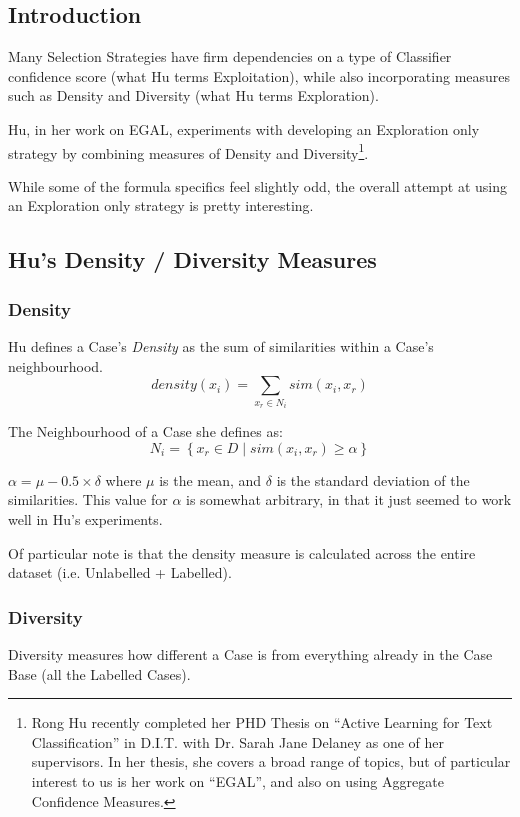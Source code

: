 \documentclass[a4paper,11pt]{report}
\begin{document}
\subsection{Introduction}
Many Selection Strategies have firm dependencies on a type of Classifier confidence score (what Hu terms Exploitation), while also incorporating measures such as Density and Diversity (what Hu terms Exploration).

Hu, in her work on EGAL, experiments with developing an Exploration only strategy by combining measures of Density and Diversity\footnote{Rong Hu recently completed her PHD Thesis on ``Active Learning for Text Classification'' in D.I.T. with Dr. Sarah Jane Delaney as one of her supervisors\citep{Hu2011}. In her thesis, she covers a broad range of topics, but of particular interest to us is her work on ``EGAL'', and also on using Aggregate Confidence Measures.}.

While some of the formula specifics feel slightly odd, the overall attempt at using an Exploration only strategy is pretty interesting. 

\subsection{Hu's Density / Diversity Measures}

\subsubsection{Density}
Hu defines a Case's \emph{Density} as the sum of similarities within a Case's neighbourhood.
\[
density(x_{i})=\underset{x_{r}\in N_{i}}{\sum}sim(x_{i},x_{r})
\]

The Neighbourhood of a Case she defines as:
\[
N_{i}=\left\{ x_{r}\in D\mid sim(x_{i},x_{r})\geq\alpha\right\} 
\]

$\alpha=\mu-0.5\times\delta$ where $\mu$ is the mean, and $\delta$ is the standard deviation of the similarities. This value for $\alpha$ is somewhat arbitrary, in that it just seemed to work well in Hu's experiments.

Of particular note is that the density measure is calculated across the entire dataset (i.e. Unlabelled + Labelled). 

\subsubsection{Diversity}

Diversity measures how different a Case is from everything already in the Case Base (all the Labelled Cases).
\end{document}
